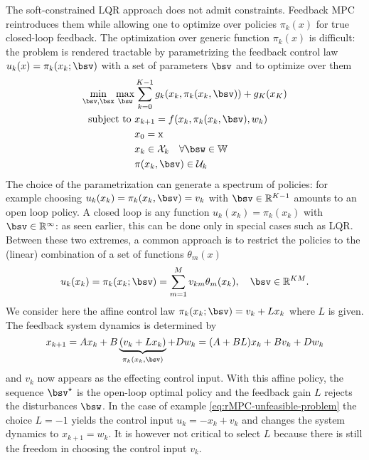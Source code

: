 The soft-constrained LQR approach does not admit constraints. Feedback MPC reintroduces them while allowing one to optimize over policies $\pi_k(x)$ for true closed-loop feedback. The optimization over generic function $\pi_k(x)$ is difficult: the problem is rendered tractable by parametrizing the feedback control law $u_k(x) = \pi_k(x_k;\bsv)$ with a set of parameters $\bsv$ and to optimize over them
\begin{equation}
  \label{eq:feedback-MPC}
  \begin{aligned}
    \min_{\bsv,\bsx} \max_{\bsw} & \sum_{k=0}^{K-1} g_k(x_k,\pi_k(x_k,\bsv)) + g_K(x_K) \\
    \text{subject to } & x_{k+1} = f(x_k,\pi_k(x_k,\bsv),w_k) \\
                                 & x_0 = \mathrm{x} \\
                                 & x_k \in \mathcal{X}_k\quad \forall \bsw \in \mathbb{W} \\
                                 & \pi(x_k,\bsv) \in \mathcal{U}_k %
  \end{aligned}
\end{equation}
The choice of the parametrization can generate a spectrum of policies: for example choosing $u_k(x_k) = \pi_k(x_k,\bsv) = v_k$ with $\bsv\in \mathbb{R}^{K-1}$ amounts to an open loop policy. A closed loop is any function $u_k(x_k)=\pi_k(x_k)$ with $\bsv\in \mathbb{R}^\infty$: as seen earlier, this can be done only in special cases such as LQR. Between these two extremes, a common approach is to restrict the policies to the (linear) combination of a set of functions $\theta_m(x)$
\begin{equation*}
  u_k(x_k) = \pi_k(x_k;\bsv) = \sum_{m=1}^M v_{km}\theta_m(x_k),\quad \bsv\in \mathbb{R}^{KM}.
\end{equation*}
We consider here the affine control law $\pi_k(x_k;\bsv) = v_k + Lx_k$ where $L$ is given. The feedback system dynamics is determined by
\begin{equation*}
  x_{k+1} = Ax_k + B\underbrace{(v_k+Lx_k)}_{\pi_k(x_k,\bsv)} + Dw_k = (A+BL)x_k + Bv_k + Dw_k
\end{equation*}
and $v_k$ now appears as the effecting control input. With this affine policy, the sequence $\bsv^\star$ is the open-loop optimal policy and the feedback gain $L$ rejects the disturbances $\bsw$. In the case of example \ref{eq:rMPC-unfeasible-problem} the choice $L=-1$ yields the control input $u_k=-x_k+v_k$ and changes the system dynamics to $x_{k+1}=w_k$. It is however not critical to select $L$ because there is still the freedom in choosing the control input $v_k$.


